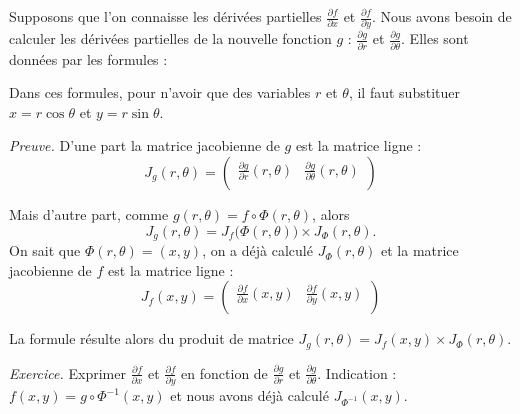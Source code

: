 \documentclass[11pt, class=report,crop=false]{standalone}
\begin{document}
Supposons que l'on connaisse les dérivées partielles 
$\frac{\partial f}{\partial x}$ et $\frac{\partial f}{\partial y}$.
Nous avons besoin de calculer les dérivées partielles de la nouvelle fonction $g$ : 
$\frac{\partial g}{\partial r}$ et $\frac{\partial g}{\partial \theta}$.
Elles sont données par les formules :

Dans ces formules, pour n'avoir que des variables $r$ et $\theta$, il faut substituer $x = r\cos\theta$ et $y=r\sin\theta$.

\bigskip

\emph{Preuve.}
D'une part la matrice jacobienne de $g$ est la matrice ligne :
$$J_g(r,\theta) = 
\begin{pmatrix}
\frac{\partial g}{\partial r}(r,\theta) &
\frac{\partial g}{\partial \theta}(r,\theta) \\
\end{pmatrix}$$

Mais d'autre part, comme $g(r,\theta)=f \circ \Phi (r,\theta)$, alors
$$ J_g(r,\theta) = J_f\big( \Phi(r,\theta) \big) \times J_\Phi(r,\theta) .$$
On sait que $\Phi(r,\theta) = (x,y)$, on a déjà calculé $J_\Phi(r,\theta)$ et la matrice jacobienne de $f$ est la matrice ligne :
$$
J_f(x,y) = 
\begin{pmatrix}
\frac{\partial f}{\partial x}(x,y) &
\frac{\partial f}{\partial y}(x,y) \\
\end{pmatrix}
$$

La formule résulte alors du produit de matrice 
$ J_g(r,\theta) = J_f(x,y) \times J_\Phi(r,\theta)$.

\bigskip

\emph{Exercice.}
Exprimer $\frac{\partial f}{\partial x}$ et $\frac{\partial f}{\partial y}$ en fonction de $\frac{\partial g}{\partial r}$ et $\frac{\partial g}{\partial \theta}$. 
Indication : $f(x,y) = g \circ \Phi^{-1} (x,y)$ et nous avons déjà calculé $J_{\Phi^{-1}}(x,y)$.


\bigskip
\end{document}

